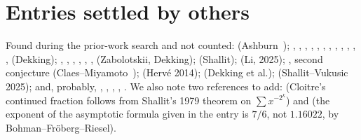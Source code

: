 \section{Entries settled by others}\label{s:others}
Found during the prior-work search and not counted:  (Ashburn~\cite{As}); ,
, , , , , , ,
, , , ,  (Dekking); ,
, , , , ,  (Zabolotskii, Dekking);
 (Shallit);  (Li, 2025); , second conjecture (Claes--Miyamoto~\cite{CM});
 (Hervé 2014);  (Dekking et al.);  (Shallit--Vukusic 2025); and, probably,
, , , , . We also note two references to add:
 (Cloitre's continued fraction follows from Shallit's 1979 theorem on $\sum x^{-2^k}$) and
 (the exponent of the asymptotic formula given in the entry is $7/6$, not $1.16022$, by
Bohman--Fröberg--Riesel).
